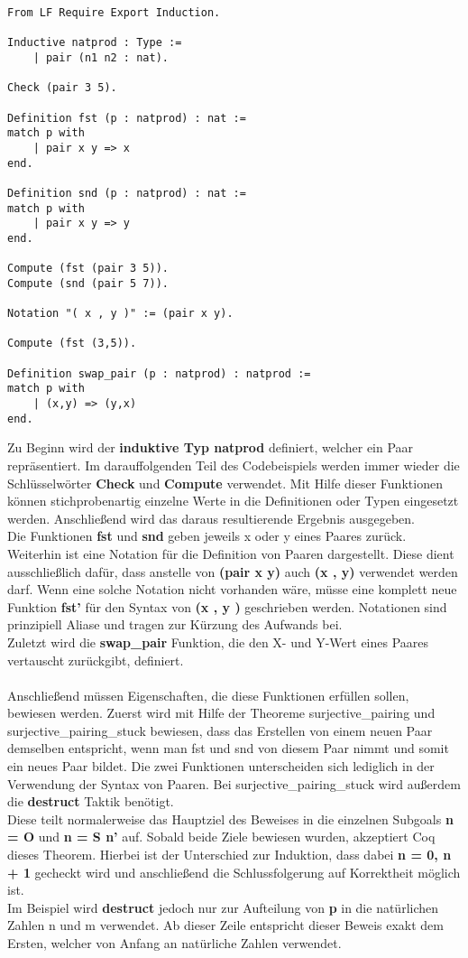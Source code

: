 \begin{lstlisting}[language=coq,firstnumber=1,caption=Coq Funktionen für Paare aus natürlichen Zahlen,label=lst:practical-functions]
From LF Require Export Induction.

Inductive natprod : Type :=
	| pair (n1 n2 : nat).

Check (pair 3 5).

Definition fst (p : natprod) : nat :=
match p with
	| pair x y => x
end.

Definition snd (p : natprod) : nat :=
match p with
	| pair x y => y
end.

Compute (fst (pair 3 5)).
Compute (snd (pair 5 7)).

Notation "( x , y )" := (pair x y).

Compute (fst (3,5)).

Definition swap_pair (p : natprod) : natprod :=
match p with
	| (x,y) => (y,x)
end.
\end{lstlisting}
Zu Beginn wird der \textbf{induktive Typ natprod} definiert, welcher ein Paar repräsentiert. Im darauffolgenden Teil des Codebeispiels werden immer wieder die Schlüsselwörter \textbf{Check} und \textbf{Compute} verwendet. Mit Hilfe dieser Funktionen können stichprobenartig einzelne Werte in die Definitionen oder Typen eingesetzt werden. Anschließend wird das daraus resultierende Ergebnis ausgegeben.\\
Die Funktionen \textbf{fst} und \textbf{snd} geben jeweils x oder y eines Paares zurück. Weiterhin ist eine Notation für die Definition von Paaren dargestellt. Diese dient ausschließlich dafür, dass anstelle von 
\textbf{(pair x y)} auch \textbf{(x , y)} verwendet werden darf. Wenn eine solche Notation nicht vorhanden wäre, müsse eine komplett neue Funktion \textbf{fst'} für den Syntax von \textbf{(x , y )} geschrieben werden. Notationen sind prinzipiell Aliase und tragen zur Kürzung des Aufwands bei.\\
Zuletzt wird die \textbf{swap\_pair} Funktion, die den X- und Y-Wert eines Paares vertauscht zurückgibt, definiert.\\
\\
Anschließend müssen Eigenschaften, die diese Funktionen erfüllen sollen, bewiesen werden.
Zuerst wird mit Hilfe der Theoreme surjective\_pairing und surjective\_pairing\_stuck bewiesen, dass das Erstellen von einem neuen Paar demselben entspricht, wenn man fst und snd von diesem Paar nimmt und somit ein neues Paar bildet. Die zwei Funktionen unterscheiden sich lediglich in der Verwendung der Syntax von Paaren. Bei surjective\_pairing\_stuck wird außerdem die \textbf{destruct} Taktik benötigt.\\
Diese teilt normalerweise das Hauptziel des Beweises in die einzelnen Subgoals \textbf{n = O} und \textbf{n = S n'} auf. Sobald beide Ziele bewiesen wurden, akzeptiert Coq dieses Theorem. Hierbei ist der Unterschied zur Induktion, dass dabei \textbf{n = 0, n + 1} gecheckt wird und anschließend die Schlussfolgerung auf Korrektheit möglich ist.\\
Im Beispiel wird \textbf{destruct} jedoch nur zur Aufteilung von \textbf{p} in die natürlichen Zahlen n und m verwendet.
Ab dieser Zeile entspricht dieser Beweis exakt dem Ersten, welcher von Anfang an natürliche Zahlen verwendet. 

